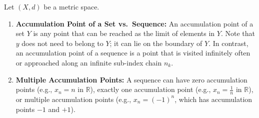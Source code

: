 \begin{content}
Let $(X, d)$ be a metric space.



\begin{steps}
\begin{enumerate}[label=\textbf{(\arabic*)}]
    \setcounter{enumi}{0} \item \textbf{Accumulation Point of a Set vs.\ Sequence:} An accumulation point of a set $Y$ is any point that can be reached as the limit of elements in $Y$. Note that $y$ does not need to belong to $Y$; it can lie on the boundary of $Y$. In contrast, an accumulation point of a sequence is a point that is visited infinitely often or approached along an infinite sub-index chain $n_k$.
    \setcounter{enumi}{1} \item \textbf{Multiple Accumulation Points:} A sequence can have zero accumulation points (e.g., $x_n = n$ in $\mathbb{R}$), exactly one accumulation point (e.g., $x_n = \frac{1}{n}$ in $\mathbb{R}$), or multiple accumulation points (e.g., $x_n = (-1)^n$, which has accumulation points $-1$ and $+1$).
\end{enumerate}
\end{steps}
\end{content}

